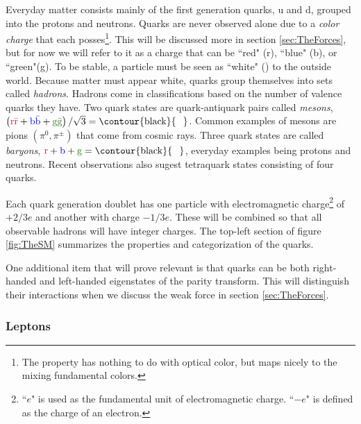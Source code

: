 Everyday matter consists mainly of the first generation quarks, u and d, grouped into the protons and neutrons. Quarks are never observed alone due to a \textit{color charge} that each posses\footnote{The property has nothing to do with optical color, but maps nicely to the mixing fundamental colors.}. This will be discussed more in section \ref{sec:TheForces}, but for now we will refer to it as a charge that can be ``red" (\textcolor{myred}{r}), ``blue" (\textcolor{myblue}{b}), or ``green"(\textcolor{mygreen}{g}). To be stable, a particle must be seen as  ``white" () to the outside world. Because matter must appear white, quarks group themselves into sets called \textit{hadrons}. Hadrons come in classifications based on the number of valence quarks they have. Two quark states are quark-antiquark pairs called \textit{mesons}, $\left(\textrm{\textcolor{myred}{r}}\textcolor{myred}{\bar{\textrm{r}}} + \textrm{\textcolor{myblue}{b}}\textcolor{myblue}{\bar{\textrm{b}}} + \textrm{\textcolor{mygreen}{g}}\textcolor{mygreen}{\bar{\textrm{g}}}\right)/\sqrt{3} = \textrm{\contour{black}{\textcolor{white}{w}}}$. Common examples of mesons are pions $\left(\pi^{0},\pi^{\pm}\right)$ that come from cosmic rays. Three quark states are called \textit{baryons}, $\mathrm{\textcolor{myred}{r}} + \mathrm{\textcolor{myblue}{b}} + \mathrm{\textcolor{mygreen}{g}} = \mathrm{\contour{black}{\textcolor{white}{w}}}$, everyday examples being protons and neutrons. Recent observations also sugest tetraquark states \cite{Aaij:2014jqa} consisting of four quarks. 

Each quark generation doublet has one particle with electromagnetic charge\footnote{``$e$" is used as the fundamental unit of electromagnetic charge. ``$-e$" is defined as the charge of an electron.} of $+2/3 e$ and another with charge $-1/3 e$. These will be combined so that all observable hadrons will have integer charges. The top-left section of figure \ref{fig:TheSM} summarizes the properties and categorization of the quarks. 

One additional item that will prove relevant is that quarks can be both right-handed and left-handed eigenstates of the parity transform. This will distinguish their interactions when we discuss the weak force in section \ref{sec:TheForces}.

\subsubsection{Leptons}
\label{sec:TheLeptons}


